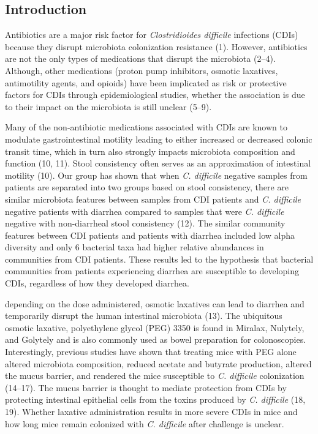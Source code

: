\documentclass[
  11pt,
]{article}
\begin{document}
\newpage

\hypertarget{introduction}{%
\subsection{Introduction}\label{introduction}}

Antibiotics are a major risk factor for \emph{Clostridioides difficile}
infections (CDIs) because they disrupt microbiota colonization
resistance (1). However, antibiotics are not the only types of
medications that disrupt the microbiota (2--4). Although, other
medications (proton pump inhibitors, osmotic laxatives, antimotility
agents, and opioids) have been implicated as risk or protective factors
for CDIs through epidemiological studies, whether the association is due
to their impact on the microbiota is still unclear (5--9).

Many of the non-antibiotic medications associated with CDIs are known to
modulate gastrointestinal motility leading to either increased or
decreased colonic transit time, which in turn also strongly impacts
microbiota composition and function (10, 11). Stool consistency often
serves as an approximation of intestinal motility (10). Our group has
shown that when \emph{C. difficile} negative samples from patients are
separated into two groups based on stool consistency, there are similar
microbiota features between samples from CDI patients and \emph{C.
difficile} negative patients with diarrhea compared to samples that were
\emph{C. difficile} negative with non-diarrheal stool consistency (12).
The similar community features between CDI patients and patients with
diarrhea included low alpha diversity and only 6 bacterial taxa had
higher relative abundances in communities from CDI patients. These
results led to the hypothesis that bacterial communities from patients
experiencing diarrhea are susceptible to developing CDIs, regardless of
how they developed diarrhea.

depending on the dose administered, osmotic laxatives can lead to
diarrhea and temporarily disrupt the human intestinal microbiota (13).
The ubiquitous osmotic laxative, polyethylene glycol (PEG) 3350 is found
in Miralax, Nulytely, and Golytely and is also commonly used as bowel
preparation for colonoscopies. Interestingly, previous studies have
shown that treating mice with PEG alone altered microbiota composition,
reduced acetate and butyrate production, altered the mucus barrier, and
rendered the mice susceptible to \emph{C. difficile} colonization
(14--17). The mucus barrier is thought to mediate protection from CDIs
by protecting intestinal epithelial cells from the toxins produced by
\emph{C. difficile} (18, 19). Whether laxative administration results in
more severe CDIs in mice and how long mice remain colonized with
\emph{C. difficile} after challenge is unclear.
\end{document}

